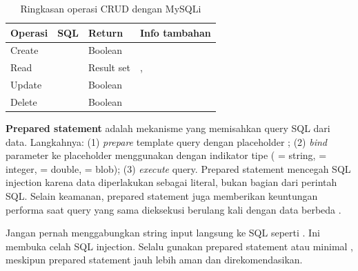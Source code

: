 \begin{table}[H]
\centering
\begin{tabular}{|P{2cm}|P{3cm}|P{3cm}|P{4cm}|}
\hline
\textbf{Operasi} & \textbf{SQL} & \textbf{Return} & \textbf{Info tambahan} \\
\hline
Create &  & Boolean &  \\
\hline
Read &  & Result set & ,  \\
\hline
Update &  & Boolean &  \\
\hline
Delete &  & Boolean &  \\
\hline
\end{tabular}
\caption{Ringkasan operasi CRUD dengan MySQLi}
\end{table}

\textbf{Prepared statement} adalah mekanisme yang memisahkan query SQL dari data. Langkahnya: (1) \textit{prepare} template query dengan placeholder ; (2) \textit{bind} parameter ke placeholder menggunakan  dengan indikator tipe ( = string,  = integer,  = double,  = blob); (3) \textit{execute} query. Prepared statement mencegah SQL injection karena data diperlakukan sebagai literal, bukan bagian dari perintah SQL. Selain keamanan, prepared statement juga memberikan keuntungan performa saat query yang sama dieksekusi berulang kali dengan data berbeda \cite{phpRightWay}.

\begin{catatan}
Jangan pernah menggabungkan string input langsung ke SQL seperti . Ini membuka celah SQL injection. Selalu gunakan prepared statement atau minimal , meskipun prepared statement jauh lebih aman dan direkomendasikan.
\end{catatan}

